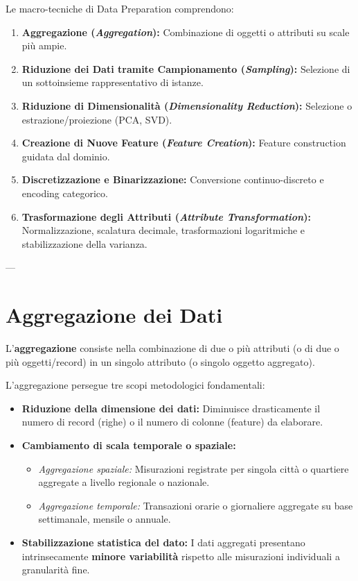 Le macro-tecniche di Data Preparation comprendono:
\begin{enumerate}
    \item \textbf{Aggregazione (\textit{Aggregation}):} Combinazione di oggetti o attributi su scale più ampie.
    \item \textbf{Riduzione dei Dati tramite Campionamento (\textit{Sampling}):} Selezione di un sottoinsieme rappresentativo di istanze.
    \item \textbf{Riduzione di Dimensionalità (\textit{Dimensionality Reduction}):} Selezione o estrazione/proiezione (PCA, SVD).
    \item \textbf{Creazione di Nuove Feature (\textit{Feature Creation}):} Feature construction guidata dal dominio.
    \item \textbf{Discretizzazione e Binarizzazione:} Conversione continuo-discreto e encoding categorico.
    \item \textbf{Trasformazione degli Attributi (\textit{Attribute Transformation}):} Normalizzazione, scalatura decimale, trasformazioni logaritmiche e stabilizzazione della varianza.
\end{enumerate}

---

\section{Aggregazione dei Dati}

\begin{definition}[Aggregazione]
L'\textbf{aggregazione} consiste nella combinazione di due o più attributi (o di due o più oggetti/record) in un singolo attributo (o singolo oggetto aggregato).
\end{definition}

L'aggregazione persegue tre scopi metodologici fondamentali:
\begin{itemize}
    \item \textbf{Riduzione della dimensione dei dati:} Diminuisce drasticamente il numero di record (righe) o il numero di colonne (feature) da elaborare.
    \item \textbf{Cambiamento di scala temporale o spaziale:}
    \begin{itemize}
        \item \textit{Aggregazione spaziale:} Misurazioni registrate per singola città o quartiere aggregate a livello regionale o nazionale.
        \item \textit{Aggregazione temporale:} Transazioni orarie o giornaliere aggregate su base settimanale, mensile o annuale.
    \end{itemize}
    \item \textbf{Stabilizzazione statistica del dato:} I dati aggregati presentano intrinsecamente \textbf{minore variabilità} rispetto alle misurazioni individuali a granularità fine.
\end{itemize}

